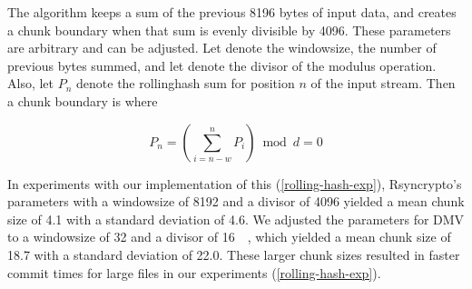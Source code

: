 The algorithm keeps a sum of the previous \num{8196} bytes of input data, and
creates a chunk boundary when that sum is evenly divisible by \num{4096}. These
parameters are arbitrary and can be adjusted. Let  denote
the \gls{windowsize}, the number of previous bytes summed, and let
 denote the \gls{divisor} of the modulus operation. Also, let
$P_n$ denote the \gls{rollinghash} sum for position $n$ of the input stream.
Then a chunk boundary is where

\begin{equation}
    P_n = \left( \sum_{i = n - w }^{n}{P_i} \right) \bmod d = 0
\end{equation}

In experiments with our implementation of this 
(\autoref{rolling-hash-exp}), Rsyncrypto's parameters with a \gls{windowsize} of
\SI{8192}{\byte} and a divisor of \num{4096} yielded a mean chunk size of
\SI{4.1}{\kib} with a standard deviation of \SI{4.6}{\kib}. We adjusted the
parameters for DMV to a \gls{windowsize} of \SI{32}{\kib} and a divisor of
\SI{16}{\kibi\relax}, which yielded a mean chunk size of \SI{18.7}{\kib} with a
standard deviation of \SI{22.0}{\kib}. These larger chunk sizes resulted in
faster commit times for large files in our experiments
(\autoref{rolling-hash-exp}).


